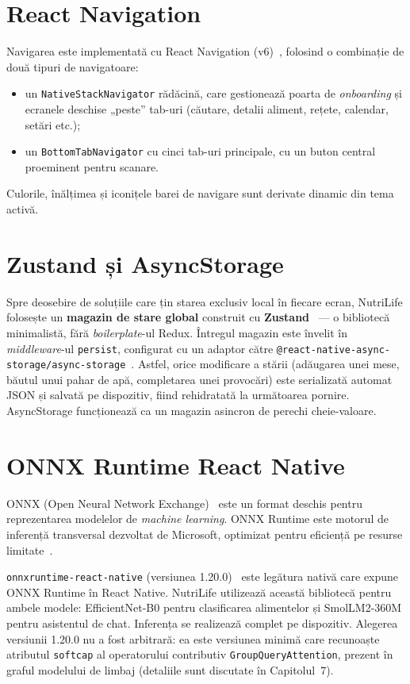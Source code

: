 \documentclass[12pt, a4paper, twoside]{report}
\numberwithin{equation}{section}
\begin{document}
\section{React Navigation}

Navigarea este implementată cu React Navigation (v6)~\cite{reactnav}, folosind o combinație de două
tipuri de navigatoare:
\begin{itemize}
  \item un \texttt{NativeStackNavigator} rădăcină, care gestionează poarta de
    \textit{onboarding} și ecranele deschise „peste'' tab-uri (căutare, detalii aliment,
    rețete, calendar, setări etc.);
  \item un \texttt{BottomTabNavigator} cu cinci tab-uri principale, cu un buton central
    proeminent pentru scanare.
\end{itemize}
Culorile, înălțimea și iconițele barei de navigare sunt derivate dinamic din tema activă.

\section{Zustand și AsyncStorage}

Spre deosebire de soluțiile care țin starea exclusiv local în fiecare ecran, NutriLife
folosește un \textbf{magazin de stare global} construit cu \textbf{Zustand}~\cite{zustand} --- o bibliotecă
minimalistă, fără \textit{boilerplate}-ul Redux. Întregul magazin este învelit în
\textit{middleware}-ul \texttt{persist}, configurat cu un adaptor către
\texttt{@react-native-async-storage/\allowbreak async-storage}~\cite{asyncstorage}. Astfel, orice modificare a stării
(adăugarea unei mese, băutul unui pahar de apă, completarea unei provocări) este serializată
automat JSON și salvată pe dispozitiv, fiind rehidratată la următoarea pornire. AsyncStorage
funcționează ca un magazin asincron de perechi cheie-valoare.

\section{ONNX Runtime React Native}

ONNX (Open Neural Network Exchange)~\cite{onnxformat} este un format deschis pentru reprezentarea modelelor de
\textit{machine learning}. ONNX Runtime este motorul de inferență transversal dezvoltat de
Microsoft, optimizat pentru eficiență pe resurse limitate~\cite{onnxruntime}.

\texttt{onnxruntime-react-native} (versiunea 1.20.0)~\cite{onnxrn} este legătura nativă care expune ONNX
Runtime în React Native. NutriLife utilizează această bibliotecă pentru ambele modele:
EfficientNet-B0 pentru clasificarea alimentelor și SmolLM2-360M pentru asistentul de chat.
Inferența se realizează complet pe dispozitiv. Alegerea versiunii 1.20.0 nu a fost
arbitrară: ea este versiunea minimă care recunoaște atributul \texttt{softcap} al
operatorului contributiv \texttt{GroupQueryAttention}, prezent în graful modelului de limbaj
(detaliile sunt discutate în Capitolul~7).
\end{document}
